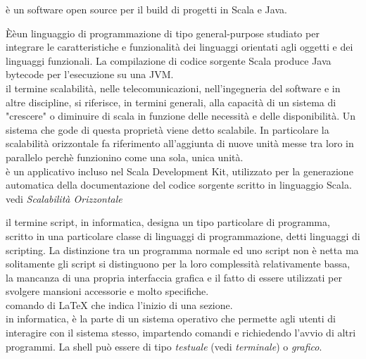 \documentclass{scalatekids-article}
\begin{document}

   è un software open source per il build di progetti in Scala e Java.

   Èèun linguaggio di programmazione di tipo general-purpose studiato per integrare le caratteristiche e funzionalità dei linguaggi orientati agli oggetti e dei linguaggi funzionali. La compilazione di codice sorgente Scala produce Java bytecode per l'esecuzione su una JVM.
  \\
  
   il termine scalabilità, nelle telecomunicazioni, nell'ingegneria del software e in altre discipline, si riferisce, in termini generali, alla capacità di un sistema di "crescere" o diminuire di scala in funzione delle necessità e delle disponibilità. Un sistema che gode di questa proprietà viene detto scalabile.
  In particolare la scalabilità orizzontale fa riferimento all’aggiunta di nuove unità messe tra loro in parallelo perchè funzionino come una sola, unica unità.
  \\

   è un applicativo incluso nel Scala Development Kit, utilizzato per la generazione automatica della documentazione del codice sorgente scritto in linguaggio Scala.
  \\
  
   vedi \textit{Scalabilità Orizzontale}

   il termine script, in informatica, designa un tipo particolare di programma, scritto in una particolare classe di linguaggi di programmazione, detti linguaggi di scripting.
  La distinzione tra un programma normale ed uno script non è netta ma solitamente gli script si distinguono per la loro complessità relativamente bassa, la mancanza di una propria interfaccia grafica e il fatto di essere utilizzati per svolgere mansioni accessorie e molto specifiche.
  \\
  
   comando di \LaTeX\xspace che indica l'inizio di una sezione.
  \\

   in informatica, è la parte di un sistema operativo che permette agli utenti di interagire con il sistema stesso, impartendo comandi e richiedendo l'avvio di altri programmi.
  La shell può essere di tipo \textit{testuale} (vedi \textit{terminale}) o \textit{grafico}.
  \\
\end{document}
